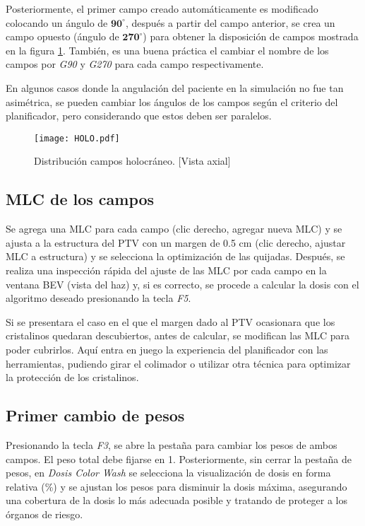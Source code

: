 \documentclass{article}
\begin{document}
Posteriormente, el primer campo creado automáticamente es modificado colocando un ángulo de $\mathbf{90^{\circ}}$, después a partir del campo anterior, se crea un campo opuesto (ángulo de $\mathbf{270^{\circ}}$) para obtener la disposición de campos mostrada en la figura \ref{HOLO}. También, es una buena práctica el cambiar el nombre de los campos por \textit{G90} y \textit{G270} para cada campo respectivamente.

En algunos casos donde la angulación del paciente en la simulación no fue tan asimétrica, se pueden cambiar los ángulos de los campos según el criterio del planificador, pero considerando que estos deben ser paralelos.

\begin{figure}[!ht]
    \centering
    \texttt{[image: HOLO.pdf]}
    \caption{Distribución campos holocráneo. [Vista axial]}
    \label{HOLO}
\end{figure}

\subsection{MLC de los campos}

Se agrega una MLC para cada campo (clic derecho, agregar nueva MLC) y se ajusta a la estructura del PTV con un margen de 0.5 cm (clic derecho, ajustar MLC a estructura) y se selecciona la optimización de las quijadas. Después, se realiza una inspección rápida del ajuste de las MLC por cada campo en la ventana BEV (vista del haz) y, si es correcto, se procede a calcular la dosis con el algoritmo deseado presionando la tecla \textit{F5}.

Si se presentara el caso en el que el margen dado al PTV ocasionara que los cristalinos quedaran descubiertos, antes de calcular, se modifican las MLC para poder cubrirlos. Aquí entra en juego la experiencia del planificador con las herramientas, pudiendo girar el colimador o utilizar otra técnica para optimizar la protección de los cristalinos.

\subsection{Primer cambio de pesos}

Presionando la tecla \textit{F3}, se abre la pestaña para cambiar los pesos de ambos campos. El peso total debe fijarse en 1. Posteriormente, sin cerrar la pestaña de pesos, en \textit{Dosis Color Wash} se selecciona la visualización de dosis en forma relativa (\%) y se ajustan los pesos para disminuir la dosis máxima, asegurando una cobertura de la dosis lo más adecuada posible y tratando de proteger a los órganos de riesgo.
\end{document}
